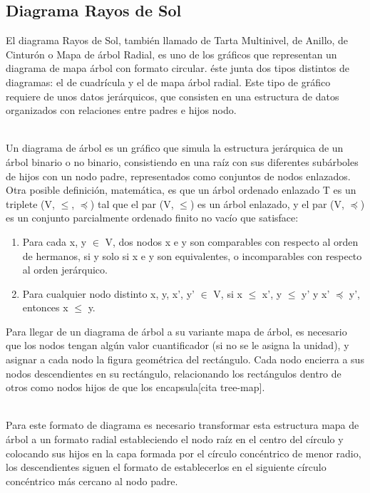 \documentclass{article}\usepackage[]{graphicx}\usepackage[]{color}
\begin{document}
\subsection{Diagrama Rayos de Sol}\label{ssec:rayos}
El diagrama Rayos de Sol, tambi\'en llamado de Tarta Multinivel, de Anillo, de Cintur\'on o Mapa de \'arbol Radial, es uno de los gr\'aficos que representan un diagrama de mapa \'arbol con formato circular. \'este junta dos tipos distintos de diagramas: el de cuadr\'icula y el de mapa \'arbol radial. Este tipo de gr\'afico requiere de unos datos jer\'arquicos, que consisten en una estructura de datos organizados con relaciones entre padres e hijos nodo.~\\~\par
Un diagrama de \'arbol es un gr\'afico que simula la estructura jer\'arquica de un \'arbol binario o no binario, consistiendo en una ra\'iz con sus diferentes sub\'arboles de hijos con un nodo padre, representados como conjuntos de nodos enlazados. Otra posible definici\'on\cite[p\'ag. 36]{tree-book}, matem\'atica, es que un \'arbol ordenado enlazado T es un triplete (V, $\leq$, $\preceq$) tal que el par (V, $\leq$) es un \'arbol enlazado, y el par (V, $\preceq$) es un conjunto parcialmente ordenado finito no vac\'io que satisface:
\begin{enumerate}
	\item Para cada x, y $\in$ V, dos nodos x e y son comparables con respecto al orden de hermanos, si y solo si x e y son equivalentes, o incomparables con respecto al orden jer\'arquico.
	\item Para cualquier nodo distinto x, y, x’, y’ $\in$ V, si x $\leq$ x’, y $\leq$ y’ y x’ $\preceq$ y’, entonces x $\leq$ y.
\end{enumerate}
Para llegar de un diagrama de \'arbol a su variante mapa de \'arbol, es necesario que los nodos tengan alg\'un valor cuantificador (si no se le asigna la unidad), y asignar a cada nodo la figura geom\'etrica del rect\'angulo. Cada nodo encierra a sus nodos descendientes en su rect\'angulo, relacionando los rect\'angulos dentro de otros como nodos hijos de que los encapsula[cita tree-map]\cite{busines-tree}.~\\~\par
Para este formato de diagrama es necesario transformar esta estructura mapa de \'arbol a un formato radial estableciendo el nodo ra\'iz en el centro del c\'irculo y colocando sus hijos en la capa formada por el c\'irculo conc\'entrico de menor radio, los descendientes siguen el formato de establecerlos en el siguiente c\'irculo conc\'entrico m\'as cercano al nodo padre\cite{radial-tree-example}\cite{radial-tree}.~\\~\par
\end{document}
